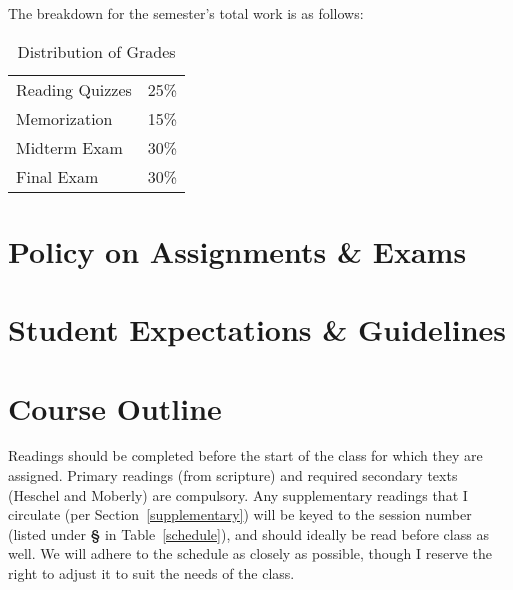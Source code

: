 \documentclass[titlepage]{article}
\newcommand\policy{../policy}
\begin{document}
The breakdown for the semester's total work is as follows:

\begin{table}[htbp]
  \centering
  {\lining
  \begin{tabular}{lr}
    \toprule
    Reading Quizzes & 25\% \\
    Memorization    & 15\% \\
    Midterm Exam    & 30\% \\
    Final Exam      & 30\% \\
    \bottomrule
  \end{tabular}}
  \caption{Distribution of Grades}
  \label{distribution}
\end{table}



\section{Policy on Assignments \& Exams}
\label{policy}





\section{Student Expectations \& Guidelines}
\label{expectations}







\section{Course Outline}
\label{outline}

Readings should be completed before the start of the class for which
they are assigned. Primary readings (from scripture) and required
secondary texts (Heschel and Moberly) are compulsory. Any supplementary
readings that I circulate (per Section~\ref{supplementary}) will be
keyed to the session number (listed under \textbf{\S} in
Table~\ref{schedule}), and should ideally be read before class as well.
We will adhere to the schedule as closely as possible, though I reserve
the right to adjust it to suit the needs of the class.
\end{document}
